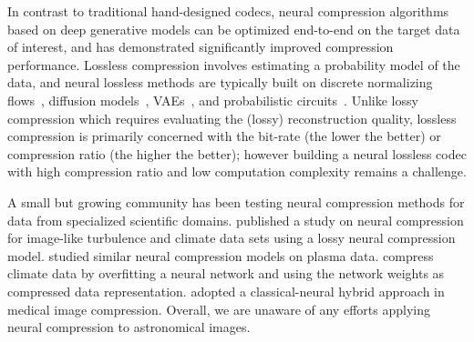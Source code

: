 In contrast to traditional hand-designed codecs, neural compression algorithms based on deep generative models \citep{yang2023introduction} can be optimized end-to-end on the target data of interest, and has demonstrated significantly improved compression performance.
Lossless compression involves estimating a probability model of the data, and neural lossless methods are typically built on
discrete normalizing flows~\citep{hoogeboom2019integer}, diffusion models~\citep{kingma2021variational}, VAEs~\citep{townsend2019practical,mentzer2019practical}, and probabilistic circuits~\citep{liu2022lossless}. 
Unlike lossy compression which requires evaluating the (lossy) reconstruction quality, lossless compression is primarily concerned with the bit-rate (the lower the better) or compression ratio (the higher the better); however building a neural lossless codec with high compression ratio and low computation complexity remains a challenge.

A small but growing community has been testing neural compression methods for data from specialized scientific domains. \citet{hayne2021using} published a study on neural compression for image-like turbulence and climate data sets using a lossy neural compression model. \citet{choi2021neural} studied similar neural compression models on plasma data. \citet{huang2023compressing} compress climate data by overfitting a neural network and using the network weights as compressed data representation. \citet{wang2023learning} adopted a classical-neural hybrid approach in medical image compression. Overall, we are unaware of any efforts applying neural compression to astronomical images.

